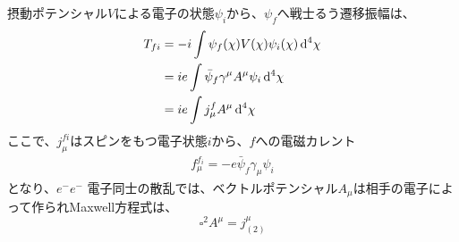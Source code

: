 \documentclass[titlepage]{ltjsarticle}
\begin{document}
摂動ポテンシャル\(V\)による電子の状態\(\psi_i\)から、\(\psi_f\)へ戦士るう遷移振幅は、
\begin{align}
  T_{fi} & = -i \int \psi_f(\chi)V(\chi) \psi_i(\chi) \odif[order=4]{\chi}\\
  & = ie \int \bar{\psi}_f \gamma^\mu A^{\mu} \psi_i \odif[order=4]{\chi}\\
  & = ie \int j_\mu^f A^\mu \odif[order=4]{\chi}
\end{align}
ここで、\(j^{fi}_{\mu}\)はスピンをもつ電子状態\(i\)から、\(f\)への電磁カレント
\begin{align}
  f^{f_i}_\mu = -e \bar{\psi}_f \gamma_\mu \psi_i
\end{align}
となり、\(e^- e^-\)
電子同士の散乱では、ベクトルポテンシャル\(A_\mu\)は相手の電子によって作られMaxwell方程式は、
\begin{equation}
  \square^2 A^\mu = j^{\mu}_{(2)}
\end{equation}
\end{document}
